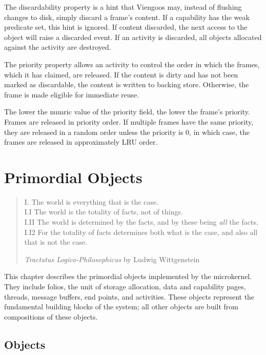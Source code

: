 The discardability property is a hint that Viengoos may, instead of
flushing changes to disk, simply discard a frame's content.  If a
capability has the weak predicate set, this hint is ignored.  If
content discarded, the next access to the object will raise a
discarded event.  If an activity is discarded, all objects allocated
against the activity are destroyed.

The priority property allows an activity to control the order in which
the frames, which it has claimed, are released.  If the content is
dirty and has not been marked as discardable, the content is written
to backing store.  Otherwise, the frame is made eligible for immediate
reuse.

The lower the numric value of the priority field, the lower the
frame's priority.  Frames are released in priority order.  If multiple
frames have the same priority, they are released in a random order
unless the priority is 0, in which case, the frames are released in
approximately LRU order.


\chapter{Primordial Objects}

\begin{quotation}
\noindent
I. The world is everything that is the case.\\
I.I The world is the totality of facts, not of things.\\
I.II The world is determined by the facts, and by these being
\emph{all} the facts.\\
I.I2 For the totality of facts determines both what is the case, and
also all that is not the case.

\begin{flushright}
\emph{Tractatus Logico-Philosophicus} by Ludwig Wittgenstein
\end{flushright}
\end{quotation}

This chapter describes the primordial objects implemented by the
microkernel.  They include folios, the unit of storage allocation,
data and capability pages, threads, message buffers, end points, and
activities.  These objects represent the fundamental building blocks
of the system; all other objects are built from compositions of these
objects.

\clearpage
\section{Objects}

